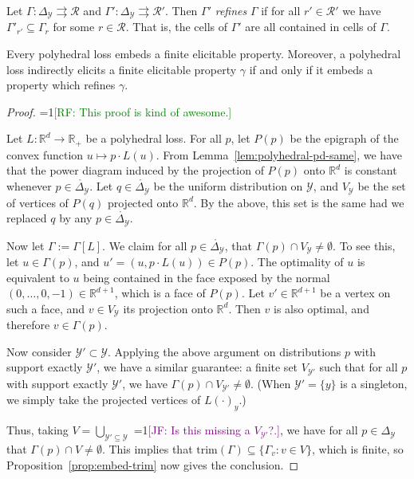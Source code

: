 \documentclass[anon,12pt]{colt2019}
\newcommand{\Comments}{1}
\newcommand{\mynote}[2]{\ifnum\Comments=1\textcolor{#1}{#2}\fi}
\newcommand{\raf}[1]{\mynote{green}{[RF: #1]}}
\newcommand{\jessie}[1]{\mynote{purple}{[JF: #1]}}
\newcommand{\reals}{\mathbb{R}}
\newcommand{\simplex}{\Delta_\Y}
\newcommand{\R}{\mathcal{R}}
\newcommand{\Y}{\mathcal{Y}}
\newcommand{\inter}[1]{\mathring{#1}}%
\newcommand{\toto}{\rightrightarrows}
\newcommand{\trim}{\mathrm{trim}}
\begin{document}
\begin{definition}
  Let $\Gamma:\simplex\toto\R$ and $\Gamma':\simplex\toto\R'$.
  Then $\Gamma'$ \emph{refines} $\Gamma$ if for all $r'\in\R'$ we have $\Gamma'_{r'} \subseteq \Gamma_r$ for some $r\in\R$.
  That is, the cells of $\Gamma'$ are all contained in cells of $\Gamma$.
\end{definition}

\begin{theorem}\label{thm:polyhedral-embed}
  Every polyhedral loss embeds a finite elicitable property.
  Moreover, a polyhedral loss indirectly elicits a finite elicitable property $\gamma$ if and only if it embeds a property which refines $\gamma$.
\end{theorem}
\begin{proof}
  \raf{This proof is kind of awesome.}

  Let $L:\reals^d\to\reals_+$ be a polyhedral loss.
  For all $p$, let $P(p)$ be the epigraph of the convex function $u\mapsto p\cdot L(u)$.
  From Lemma~\ref{lem:polyhedral-pd-same}, we have that the power diagram induced by the projection of $P(p)$ onto $\reals^d$ is constant whenever $p\in\inter\simplex$.
  Let $q\in\inter\simplex$ be the uniform distribution on $\Y$, and $V_\Y$ be the set of vertices of $P(q)$ projected onto $\reals^d$.
  By the above, this set is the same had we replaced $q$ by any $p\in\inter\simplex$.

  Now let $\Gamma := \Gamma[L]$.
  We claim for all $p\in\inter\simplex$, that $\Gamma(p) \cap V_\Y \neq \emptyset$.
  To see this, let $u \in \Gamma(p)$, and $u' = (u,p\cdot L(u)) \in P(p)$.
  The optimality of $u$ is equivalent to $u$ being contained in the face exposed by the normal $(0,\ldots,0,-1)\in\reals^{d+1}$, which is a face of $P(p)$.
  Let $v'\in\reals^{d+1}$ be a vertex on such a face, and $v\in V_\Y$ its projection onto $\reals^d$.
  Then $v$ is also optimal, and therefore $v\in\Gamma(p)$.

  Now consider $\Y'\subset \Y$.
  Applying the above argument on distributions $p$ with support exactly $\Y'$, we have a similar guarantee: a finite set $V_{\Y'}$ such that for all $p$ with support exactly $\Y'$, we have $\Gamma(p) \cap V_{\Y'} \neq \emptyset$.
  (When $\Y' = \{y\}$ is a singleton, we simply take the projected vertices of $L(\cdot)_y$.)

  Thus, taking $V = \bigcup_{\Y'\subseteq\Y}$ \jessie{Is this missing a $V_{\Y'}$?.}, we have for all $p\in\simplex$ that $\Gamma(p) \cap V \neq \emptyset$.
  This implies that $\trim(\Gamma) \subseteq \{\Gamma_v : v\in V\}$, which is finite, so Proposition~\ref{prop:embed-trim} now gives the conclusion.
\end{proof}
\end{document}
